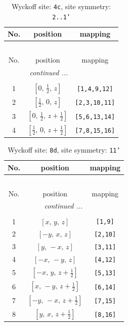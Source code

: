 \documentclass[fleqn,8pt]{jsarticle}
\begin{document}
\renewcommand{\arraystretch}{1.2}
\begin{longtable}{ccc}
\caption{Wyckoff site: {\tt 4c}, site symmetry: {\tt 2..1'}}
 \\
 \hline \hline
No. & position & mapping \\ \hline \endfirsthead

\multicolumn{2}{l}{\tablename\ \thetable{}} \\
 \hline \hline
No. & position & mapping \\ \hline \endhead

 \hline \hline
\multicolumn{2}{r}{\footnotesize\it continued ...} \\ \endfoot

 \hline \hline
\multicolumn{2}{r}{} \\ \endlastfoot

1 & $\left[ 0,\, \frac{1}{2},\, z \right]$ & {\tt [1,4,9,12]} \\ \hline
2 & $\left[ \frac{1}{2},\, 0,\, z \right]$ & {\tt [2,3,10,11]} \\ \hline
3 & $\left[ 0,\, \frac{1}{2},\, z + \frac{1}{2} \right]$ & {\tt [5,6,13,14]} \\ \hline
4 & $\left[ \frac{1}{2},\, 0,\, z + \frac{1}{2} \right]$ & {\tt [7,8,15,16]} \\
\end{longtable}
\renewcommand{\arraystretch}{1.2}
\begin{longtable}{ccc}
\caption{Wyckoff site: {\tt 8d}, site symmetry: {\tt 11'}}
 \\
 \hline \hline
No. & position & mapping \\ \hline \endfirsthead

\multicolumn{2}{l}{\tablename\ \thetable{}} \\
 \hline \hline
No. & position & mapping \\ \hline \endhead

 \hline \hline
\multicolumn{2}{r}{\footnotesize\it continued ...} \\ \endfoot

 \hline \hline
\multicolumn{2}{r}{} \\ \endlastfoot

1 & $\left[ x,\, y,\, z \right]$ & {\tt [1,9]} \\ \hline
2 & $\left[ - y,\, x,\, z \right]$ & {\tt [2,10]} \\ \hline
3 & $\left[ y,\, - x,\, z \right]$ & {\tt [3,11]} \\ \hline
4 & $\left[ - x,\, - y,\, z \right]$ & {\tt [4,12]} \\ \hline
5 & $\left[ - x,\, y,\, z + \frac{1}{2} \right]$ & {\tt [5,13]} \\ \hline
6 & $\left[ x,\, - y,\, z + \frac{1}{2} \right]$ & {\tt [6,14]} \\ \hline
7 & $\left[ - y,\, - x,\, z + \frac{1}{2} \right]$ & {\tt [7,15]} \\ \hline
8 & $\left[ y,\, x,\, z + \frac{1}{2} \right]$ & {\tt [8,16]} \\
\end{longtable}
\end{document}
